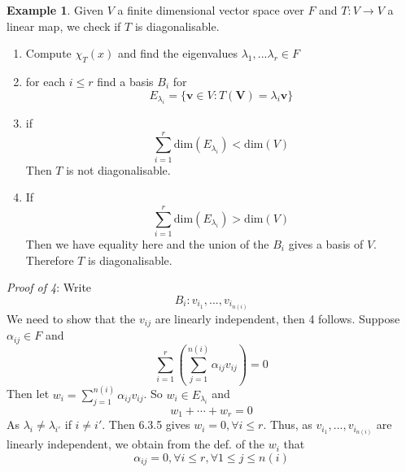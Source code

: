 \documentclass{report}
\theoremstyle{remark}
\theoremstyle{definition}
\theoremstyle{definition}
\newtheorem{example}[theorem]{Example}
\theoremstyle{theorem}
\renewcommand{\v}[1]{\mathbf{#1}}
\begin{document}
\begin{example}
Given $V$ a finite dimensional vector space over $F$ and $T:V \rightarrow V$ a linear map, we check if $T$ is diagonalisable.
\begin{enumerate}[label=\textcircled{\tiny{\arabic*}}]
    \item Compute $\chi_T(x)$ and find the eigenvalues $\lambda_1,...\lambda_r \in F$
    \item for each $ i \leq r$ find a basis $B_i$ for
    \[E_{\lambda_{i}}=\{\v{v} \in V: T(\v{V})=\lambda_i\v{v}\}\]
    \item if 
    \[\sum_{i=1}^r\mathrm{dim}(E_{\lambda_{i}})< \mathrm{dim}(V)\]
    Then $T$ is not diagonalisable.
    \item If
    \[\sum_{i=1}^r\mathrm{dim}(E_{\lambda_i})>\mathrm{dim}(V)\]
    Then we have equality here and the union of the $B_i$ gives a basis of $V$. Therefore $T$ is diagonalisable.
    \end{enumerate}
    \emph{Proof of \textcircled{\tiny{4}}}: Write 
    \[B_i:v_{i_1},...,v_{i_{n(i)}}\]
    We need to show that the $v_{ij}$ are linearly independent, then \textcircled{\tiny{4}} follows. Suppose $\alpha_{ij} \in F$ and
    \[\sum_{i=1}^r\left(\sum_{j=1}^{n(i)}\alpha_{ij}v_{ij}\right)=0\]
    Then let $w_i=\sum_{j=1}^{n(i)}\alpha_{ij}v_{ij}$. So $w_i \in E_{\lambda_i}$ and
    \[w_1+\cdots+w_r=0\]
    As $\lambda_i\neq\lambda_{i'}$ if $i \neq i'$. Then 6.3.5 gives $w_i = 0, \forall i \leq r$. Thus, as $v_{i_1},...,v_{i_{n(i)}}$ are linearly independent, we obtain from the def. of the $w_i$ that 
    \[\alpha_{ij}=0,\forall i\leq r, \forall 1\leq j\leq n(i)\]
\end{example}
\end{document}

